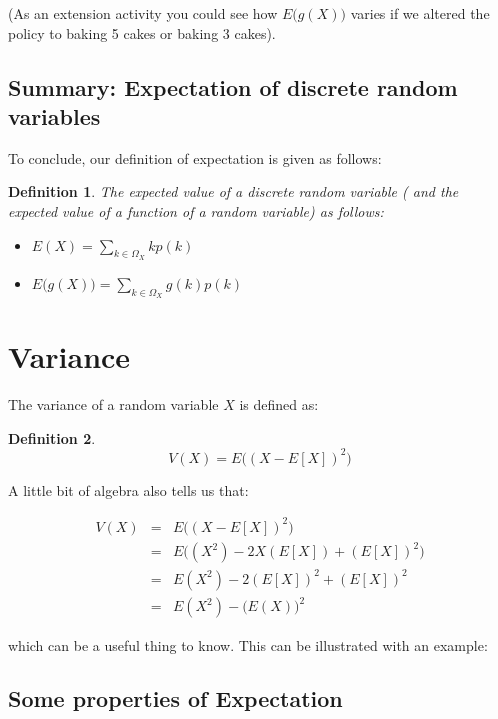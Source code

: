 \documentclass[12pt]{extbook}
\newtheorem{df}{Definition}[section]
\begin{document}
(As an extension activity you could see how $E \big( g(X) \big)$ varies if we altered the policy to baking 5 cakes or baking 3 cakes).

\subsection{Summary: Expectation of discrete random variables}

To conclude, our definition of expectation is given as follows:

\begin{df}
The expected value of a discrete random variable ({\color{red} and the expected value of a \emph{function} of a random variable}) as follows:
\begin{itemize}
\item $E(X) = \sum_{k \in \Omega_X} k p(k)$
\item {\color{red}$E\big( g(X) \big) = \sum_{k \in \Omega_X} g(k) p(k)$}
\end{itemize}
\end{df}


\section{Variance}

The variance of a random
variable $X$ is defined as:


\begin{df}
\begin{displaymath}
V (X) = E \big( (X-E[X])^2 \big)
\end{displaymath}
\end{df}

A little bit of algebra also tells us that:

\begin{eqnarray*}
V(X) &=& E \big( (X-E[X])^2 \big) \\
 &=& E\big( (X^2)-2X(E[X]) + (E[X])^2 \big) \\
 &=& E(X^2) - 2(E[X])^2 + (E[X])^2\\
 &=& E(X^2) - \big(E(X)\big)^2
\end{eqnarray*}

which can be a useful thing to know.   This can be illustrated with an example:


\subsection{Some properties of Expectation}
\end{document}
